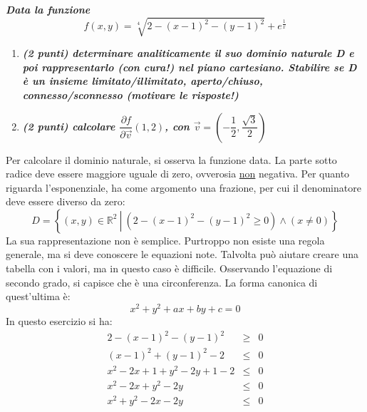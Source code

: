 \documentclass[a4paper]{article}
\begin{document}
	\textcolor{Green4}{\textbf{\emph{Data la funzione}}}
	\begin{equation*}
		f\left(x,y\right) = \sqrt[4]{2 - \left(x-1\right)^{2} - \left(y-1\right)^{2}} + e^{\frac{1}{x}}
	\end{equation*}
	\begin{enumerate}[label=\alph*)]
		\item \textcolor{Green4}{\textbf{\emph{(2 punti) determinare analiticamente il suo dominio naturale D e poi rappresentarlo (con cura!) nel piano cartesiano. Stabilire se D è un insieme limitato/illimitato, aperto/chiuso, connesso/sconnesso (motivare le risposte!)}}}
		
		\item \textcolor{Green4}{\textbf{\emph{(2 punti) calcolare $\dfrac{\partial f}{\partial \overrightarrow{v}}\left(1,2\right)$, con $\overrightarrow{v} = \left(-\dfrac{1}{2}, \dfrac{\sqrt{3}}{2}\right)$}}}
	\end{enumerate}
	Per calcolare il dominio naturale, si osserva la funzione data. La parte sotto radice deve essere maggiore uguale di zero, ovverosia \underline{non} negativa. Per quanto riguarda l'esponenziale, ha come argomento una frazione, per cui il denominatore deve essere diverso da zero:
	\begin{equation*}
		D = \left\{\left(x,y\right) \in \mathbb{R}^{2} \: \left| \: \left(2 - \left(x-1\right)^{2} - \left(y-1\right)^{2} \ge 0\right) \land \left(x \ne 0\right) \right. \right\}
	\end{equation*}
	La sua rappresentazione non è semplice. Purtroppo non esiste una regola generale, ma si deve conoscere le equazioni note. Talvolta può aiutare creare una tabella con i valori, ma in questo caso è difficile. Osservando l'equazione di secondo grado, si capisce che è una circonferenza. La forma canonica di quest'ultima è:
	\begin{equation*}
		x^{2} + y^{2} + ax + by + c = 0
	\end{equation*}
	In questo esercizio si ha:
	\begin{equation*}
		\begin{array}{rcl}
			2 - \left(x-1\right)^{2} - \left(y-1\right)^{2} &\ge& 0 \\ [.5em]
			\left(x-1\right)^{2} + \left(y-1\right)^{2} - 2 &\le& 0 \\ [.5em]
			x^{2} - 2x + 1 + y^{2} - 2y + 1 - 2 &\le& 0 \\ [.5em]
			x^{2} - 2x + y^{2} - 2y &\le& 0 \\ [.5em]
			x^{2} + y^{2} - 2x - 2y &\le& 0
		\end{array}
	\end{equation*}
\end{document}
